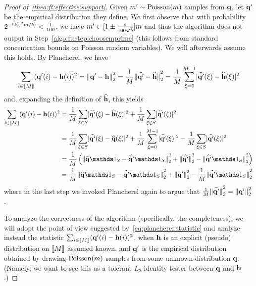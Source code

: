 \begin{proof}[Proof of~\cref{theo:ft:effective:support}]
Given $m'\sim\operatorname{Poisson}\!\left( m \right) $ samples from $\mathbf{q}$, let $\mathbf{q}'$ be the empirical distribution they define. 
We first observe that with probability $2^{-\Omega(\varepsilon^2m/b)}< \frac{1}{100}$, we have $m' \in [1\pm \frac{\varepsilon}{100\sqrt{b}}]m$ and thus the algorithm does not output \reject in Step~\ref{algo:ft:step:choosemprime} (this follows from standard concentration bounds on Poisson random variables). We will afterwards assume this holds. By Plancherel, we have
\[
  \sum_{i\in \llbracket M\rrbracket} (\mathbf{q}'(i)-\mathbf{h}(i))^2 = {\lVert\mathbf{q}'-\mathbf{h}{\rVert}}_2^2 =  \frac{1}{M}{\lVert\widehat{\mathbf{q}'}-\widehat{\mathbf{h}}{\rVert}}_2^2 = \frac{1}{M}\sum_{\xi=0}^{M-1} \lvert \widehat{\mathbf{q}'}(\xi)-\widehat{\mathbf{h}}(\xi) \rvert^2
\]
and, expanding the definition of $\widehat{\mathbf{h}}$, this yields
\begin{align}
  \sum_{i\in \modulo{M}} (\q'(i)-\h(i))^2 &=  \frac{1}{M}\sum_{\xi\in S} \dabs{\fourier{\q'}(\xi)-\fourier{\h}(\xi)}^2 + \frac{1}{M}\sum_{\xi\notin S} \dabs{\fourier{\q'}(\xi)}^2 \notag\\
  &=  \frac{1}{M}\sum_{\xi\in S} \dabs{\fourier{\q'}(\xi)-\fourier{\q}(\xi)}^2 + \frac{1}{M}\sum_{\xi=0}^{M-1} \dabs{\fourier{\q'}(\xi)}^2 
  - \frac{1}{M}\sum_{\xi\in S} \dabs{\fourier{\q'}(\xi)}^2 \notag\\
  &=  \frac{1}{M}\left(\normtwo{\fourier{\q}\indicSet{S}-\fourier{\q'}\indicSet{S}}^2 + \normtwo{\fourier{\q'}}^2 - \normtwo{\fourier{\q'}\indicSet{S}}^2\right)  \notag\\
  &=  \frac{1}{M}\normtwo{\fourier{\q}\indicSet{S}-\fourier{\q'}\indicSet{S}}^2 + \normtwo{\q'}^2 - \frac{1}{M}\normtwo{\fourier{\q'}\indicSet{S}}^2  \label{eq:plancherel:statistic}
\end{align}
where in the last step we invoked  Plancherel again to argue that $\frac{1}{M}{\lVert\widehat{\mathbf{q}'}{\rVert}}_2^2={\lVert\mathbf{q}'{\rVert}}_2^2$.

To analyze the correctness of the algorithm (specifically, the completeness), we will adopt the point of view suggested by~\eqref{eq:plancherel:statistic} and analyze instead the statistic
$\sum_{i\in \llbracket M\rrbracket} (\mathbf{q}'(i)-\mathbf{h}(i))^2$, when $\mathbf{h}$ is an explicit (pseudo) distribution on $\llbracket M\rrbracket$ assumed known, and $\mathbf{q}'$ is the empirical distribution obtained by drawing $\operatorname{Poisson}\!\left( m \right) $ samples from some unknown distribution $\mathbf{q}$. (Namely, we want to see this as a tolerant $L_2$ identity tester between $\mathbf{q}$ and $\mathbf{h}$.)


\end{proof}
